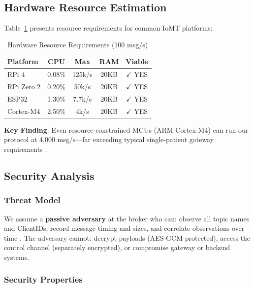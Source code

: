 \documentclass[conference]{IEEEtran}
\begin{document}
\subsection{Hardware Resource Estimation}

Table~\ref{tab:hardware} presents resource requirements for common IoMT platforms:

\begin{table}[htbp]
\caption{Hardware Resource Requirements (100 msg/s)}
\label{tab:hardware}
\centering
\begin{tabular}{lcccc}
\toprule
\textbf{Platform} & \textbf{CPU} & \textbf{Max} & \textbf{RAM} & \textbf{Viable} \\
\midrule
RPi 4 & 0.08\% & 125k/s & 20KB & $\checkmark$ YES \\
RPi Zero 2 & 0.20\% & 50k/s & 20KB & $\checkmark$ YES \\
ESP32 & 1.30\% & 7.7k/s & 20KB & $\checkmark$ YES \\
Cortex-M4 & 2.50\% & 4k/s & 20KB & $\checkmark$ YES \\
\bottomrule
\end{tabular}
\end{table}

\textbf{Key Finding}: Even resource-constrained MCUs (ARM Cortex-M4) can run our protocol at 4,000 msg/s---far exceeding typical single-patient gateway requirements \cite{iot_middleware, mqtt_performance_eval}.

\subsection{Security Analysis}

\subsubsection{Threat Model}

We assume a \textbf{passive adversary} at the broker who can: observe all topic names and ClientIDs, record message timing and sizes, and correlate observations over time \cite{anonymity_terminology, pub_sub_security_survey}. The adversary cannot: decrypt payloads (AES-GCM protected), access the control channel (separately encrypted), or compromise gateway or backend systems.

\subsubsection{Security Properties}
\end{document}
